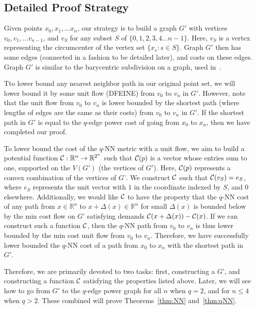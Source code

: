 \subsection{Detailed Proof Strategy}

Given points $x_0, x_1, \ldots x_n$, our strategy is to build a graph $G'$ with
vertices $v_0, v_1, \ldots v_{n-1}$, and $v_S$ for any subset $S$ of
$\{0,1,2,3,4 \ldots n-1 \}$. Here, $v_S$ is a vertex representing the
circumcenter of the vertex set $\{x_s: s \in S\}$. Graph $G'$ then has some
edges (connected in a fashion to be detailed later), and costs on these edges.
Graph $G'$ is similar to the barycentric subdivision on a graph, used
in~\cite{}.

Tto lower bound any nearest neighbor path in our original point set, we will
lower bound it by some unit flow (DFEINE) from $v_0$ to $v_n$ in $G'$. However,
note that the unit flow from $v_0$ to $v_n$ is lower bounded by the shortest
path (where lengths of edges are the same as their costs) from $v_0$ to $v_n$
in $G'$. If the shortest path in $G'$ is equal to the $q$-edge power cost of
going from $x_0$ to $x_n$, then we have completed our proof.

To lower bound the cost of the $q$-NN metric with a unit flow, we aim to build
a potential function $\mathcal{C}:\mathbb{R}^n \rightarrow \mathbb{R}^{2^n}$ such
that $\mathcal{C}(p)$ is a vector whose entries sum to one, supported on the $ V(G')$ (the vertices of
$G'$). Here, $\mathcal{C}(p)$
represents a convex combination of the vertices of $G’$. We construct $\mathcal{C}$
such that $\mathcal{C}(v_S) = e_S$, where $e_S$ represents the unit vector with $1$
in the coordinate indexed by $S$, and $0$ elsewhere. Additionally, we would
like $\mathcal{C}$ to have
the property that the $q$-NN cost of any path from $x \in \mathbb{R}^n$ to
$x+\Delta(x) \in \mathbb{R}^n$ for small $\Delta(x)$ is
bounded below by the min cost flow on $G’$ satisfying demands
$\mathcal{C}(x+\Delta(x)) - \mathcal{C}(x)$. If we can construct such a function $\mathcal{C}$,
then the $q$-NN path from $v_0$ to $v_n$ is thus lower bounded by the min cost
unit flow from $v_0$ to $v_n$.
 Therefore, we have successfully lower bounded
the $q$-NN cost of a path from $x_0$ to $x_n$ with the shortest path in $G'$.

Therefore, we are primarily devoted to two tasks: first,
constructing a $G’$, and constructing a function
$\mathcal{C}$ satisfying the properties listed above.  Later, we will see how to
go from $G'$ to the $q$-edge power graph for all $n$ when $q=2$, and for $
n\leq 4$ when $q > 2$. These combined will prove Theorems~\ref{thm:NN}
and~\ref{thm:qNN}.
